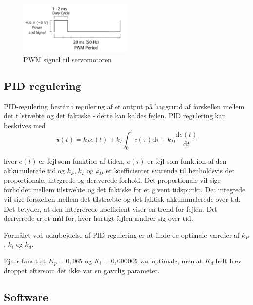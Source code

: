 \begin{figure}[h]
  \centering
  \includegraphics[width=0.5\textwidth]{./figurer/anath3.png}
  \caption{PWM signal til servomotoren}
  \label{fig:anath3}
\end{figure}

\subsection{PID regulering}
\label{sec:overordnet-mal}

PID-regulering består i regulering af et output på baggrund af forskellen mellem det tilstræbte og det faktiske - dette kan kaldes fejlen. PID regulering kan beskrives med
\begin{equation}
  \label{eq:1}
  u(t)=k_Pe(t)+k_I \int_0^t e(\tau)\mathrm{d}\tau + k_D\frac{\mathrm{d}e(t)}{\mathrm{d}t}
\end{equation}

hvor $e(t)$ er fejl som funktion af tiden, $e(\tau)$ er fejl som funktion af den akkumulerede tid og $k_P$, $k_I$ og $k_D$ er koefficienter svarende til henholdsvis det proportionale, integrede og deriverede forhold. Det proportionale vil sige forholdet mellem tilstræbte og det faktiske for et givent tidspunkt. Det integrede vil sige forskellen mellem det tilstræbte og det faktisk akkummulerede over tid. Det betyder, at den integrerede koefficient viser en trend for fejlen. Det deriverede er et mål for, hvor hurtigt fejlen ændrer sig over tid.

Formålet ved udarbejdelse af PID-regulering er at finde de optimale værdier af $k_P$, $k_i$ og $k_d$.


Fjare\autocite{pid1} fandt at $K_p=0,065$ og $K_i=0,000005$ var optimale, men at $K_d$ helt blev droppet eftersom det ikke var en gavnlig parameter.

\subsection{Software}
\label{sec:software}

